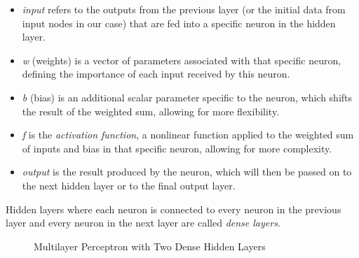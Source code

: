 \begin{itemize}
  \item \textit{input} refers to the outputs from the previous layer (or the initial data from input nodes in our case) that are fed into a specific neuron in the hidden layer.
  \item \textit{w} (weights) is a vector of parameters associated with that specific neuron, defining the importance of each input received by this neuron. 
  \item \textit{b} (bias) is an additional scalar parameter specific to the neuron, which shifts the result of the weighted sum, allowing for more flexibility.
  \item \textit{f} is the \textit{activation function}, a nonlinear function applied to the weighted sum of inputs and bias in that specific neuron, allowing for more complexity.
  \item \textit{output} is the result produced by the neuron, which will then be passed on to the next hidden layer or to the final output layer.
\end{itemize}

\noindent Hidden layers where each neuron is connected to every neuron in the previous layer 
and every neuron in the next layer are called \textit{dense layers}.


\begin{figure}[h!]
  \centering
  \caption{Multilayer Perceptron with Two Dense Hidden Layers}
  \label{fig:mlp_diagram}
\end{figure}


